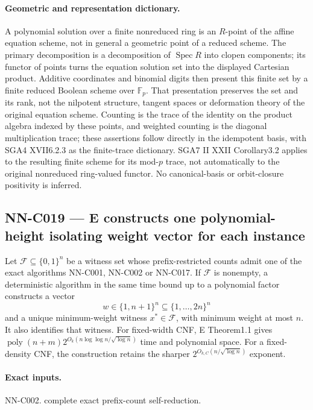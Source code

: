 \paragraph{Geometric and representation dictionary.}
A polynomial solution over a finite nonreduced ring is an $R$-point of the affine equation scheme, not in general a geometric point of a reduced scheme. The primary decomposition is a decomposition of $\operatorname{Spec}R$ into clopen components; its functor of points turns the equation solution set into the displayed Cartesian product. Additive coordinates and binomial digits then present this finite set by a finite reduced Boolean scheme over $\mathbb F_p$. That presentation preserves the set and its rank, not the nilpotent structure, tangent spaces or deformation theory of the original equation scheme. Counting is the trace of the identity on the product algebra indexed by these points, and weighted counting is the diagonal multiplication trace; these assertions follow directly in the idempotent basis, with SGA4 XVII6.2.3 as the finite-trace dictionary. SGA7 II XXII Corollary3.2 applies to the resulting finite scheme for its mod-$p$ trace, not automatically to the original nonreduced ring-valued functor. No canonical-basis or orbit-closure positivity is inferred.

\subsection{NN-C019 --- E constructs one polynomial-height isolating weight vector for each instance}
\begin{proposition}[NN-C019]
Let $\mathcal F\subseteq\{0,1\}^n$ be a witness set whose prefix-restricted counts admit one of the exact algorithms NN-C001, NN-C002 or NN-C017. If $\mathcal F$ is nonempty, a deterministic algorithm in the same time bound up to a polynomial factor constructs a vector
\[
 w\in\{1,n+1\}^n\subseteq\{1,\ldots,2n\}^n
\]
and a unique minimum-weight witness $x^*\in\mathcal F$, with minimum weight at most $n$. It also identifies that witness. For fixed-width CNF, E Theorem1.1 gives $\operatorname{poly}(n+m)2^{O_k(n\log\log n/\sqrt{\log n})}$ time and polynomial space. For a fixed-density CNF, the construction retains the sharper $2^{O_{k,C}(n/\sqrt{\log n})}$ exponent.
\end{proposition}
\paragraph{Exact inputs.}
NN-C002. complete exact prefix-count self-reduction.


